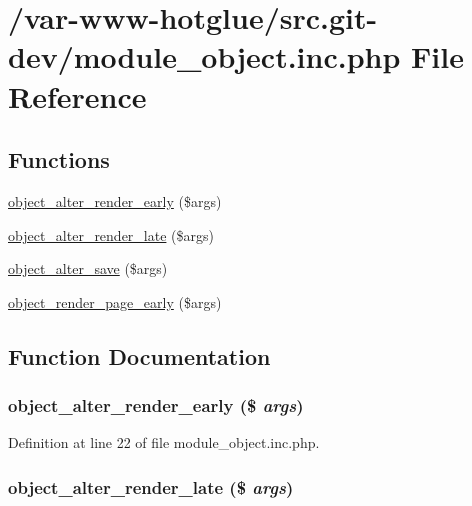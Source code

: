 \hypertarget{module__object_8inc_8php}{
\section{/var-\/www-\/hotglue/src.git-\/dev/module\_\-object.inc.php File Reference}
\label{module__object_8inc_8php}
}
\subsection*{Functions}
\begin{DoxyCompactItemize}
\item 
\hyperlink{module__object_8inc_8php_a6acc3273ff9872e01527162375d318d8}{object\_\-alter\_\-render\_\-early} (\$args)
\item 
\hyperlink{module__object_8inc_8php_a6b5bf16a15b7d5809bd7c6d15cd05a52}{object\_\-alter\_\-render\_\-late} (\$args)
\item 
\hyperlink{module__object_8inc_8php_aba3a00b339dc7e9831b48a94f4f8e211}{object\_\-alter\_\-save} (\$args)
\item 
\hyperlink{module__object_8inc_8php_ad06c13f1778d655f4a011d1763c6e618}{object\_\-render\_\-page\_\-early} (\$args)
\end{DoxyCompactItemize}


\subsection{Function Documentation}
\hypertarget{module__object_8inc_8php_a6acc3273ff9872e01527162375d318d8}{
\subsubsection[{object\_\-alter\_\-render\_\-early}]{\setlength{\rightskip}{0pt plus 5cm}object\_\-alter\_\-render\_\-early (\$ {\em args})}}
\label{module__object_8inc_8php_a6acc3273ff9872e01527162375d318d8}


Definition at line 22 of file module\_\-object.inc.php.

\hypertarget{module__object_8inc_8php_a6b5bf16a15b7d5809bd7c6d15cd05a52}{
\subsubsection[{object\_\-alter\_\-render\_\-late}]{\setlength{\rightskip}{0pt plus 5cm}object\_\-alter\_\-render\_\-late (\$ {\em args})}}
\label{module__object_8inc_8php_a6b5bf16a15b7d5809bd7c6d15cd05a52}



